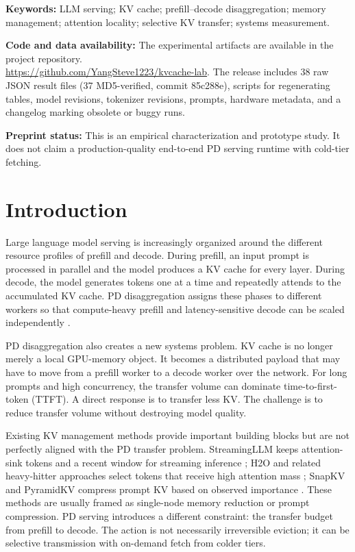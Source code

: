 \documentclass[11pt]{article}
\theoremstyle{definition}
\theoremstyle{plain}
\begin{document}
\noindent\textbf{Keywords:} LLM serving; KV cache; prefill--decode disaggregation; memory management; attention locality; selective KV transfer; systems measurement.

\noindent\textbf{Code and data availability:} The experimental artifacts are available in the project repository.\\
\url{https://github.com/YangSteve1223/kvcache-lab}.  The release includes 38 raw JSON result files (37 MD5-verified, commit 85c288e), scripts for regenerating tables, model revisions, tokenizer revisions, prompts, hardware metadata, and a changelog marking obsolete or buggy runs.

\noindent\textbf{Preprint status:} This is an empirical characterization and prototype study.  It does not claim a production-quality end-to-end PD serving runtime with cold-tier fetching.

\section{Introduction}
\label{sec:introduction}

Large language model serving is increasingly organized around the different resource profiles of prefill and decode.  During prefill, an input prompt is processed in parallel and the model produces a KV cache for every layer.  During decode, the model generates tokens one at a time and repeatedly attends to the accumulated KV cache.  PD disaggregation assigns these phases to different workers so that compute-heavy prefill and latency-sensitive decode can be scaled independently \citep{splitwise,distserve,mooncake}.

PD disaggregation also creates a new systems problem.  KV cache is no longer merely a local GPU-memory object.  It becomes a distributed payload that may have to move from a prefill worker to a decode worker over the network.  For long prompts and high concurrency, the transfer volume can dominate time-to-first-token (TTFT).  A direct response is to transfer less KV.  The challenge is to reduce transfer volume without destroying model quality.

Existing KV management methods provide important building blocks but are not perfectly aligned with the PD transfer problem.  StreamingLLM keeps attention-sink tokens and a recent window for streaming inference \citep{streamingllm}; H2O and related heavy-hitter approaches select tokens that receive high attention mass \citep{h2o}; SnapKV and PyramidKV compress prompt KV based on observed importance \citep{snapkv,pyramidkv}.  These methods are usually framed as single-node memory reduction or prompt compression.  PD serving introduces a different constraint: the transfer budget from prefill to decode.  The action is not necessarily irreversible eviction; it can be selective transmission with on-demand fetch from colder tiers.
\end{document}
